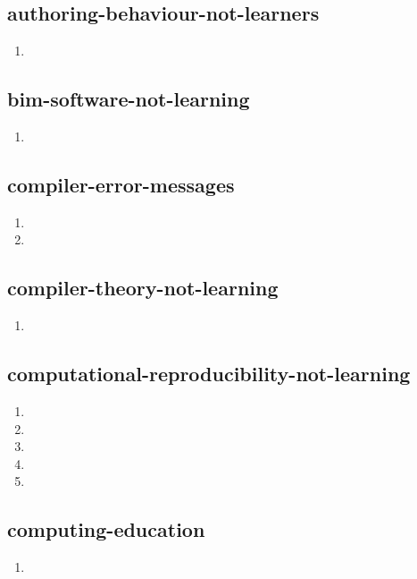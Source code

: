 \documentclass{article}
\begin{document}
\subsection{authoring-behaviour-not-learners}
\begin{enumerate}
\item {}
\end{enumerate}

\subsection{bim-software-not-learning}
\begin{enumerate}
\item {}
\end{enumerate}

\subsection{compiler-error-messages}
\begin{enumerate}
\item {}
\item {}
\end{enumerate}

\subsection{compiler-theory-not-learning}
\begin{enumerate}
\item {}
\end{enumerate}

\subsection{computational-reproducibility-not-learning}
\begin{enumerate}
\item {}
\item {}
\item {}
\item {}
\item {}
\end{enumerate}

\subsection{computing-education}
\begin{enumerate}
\item {}
\end{enumerate}
\end{document}
